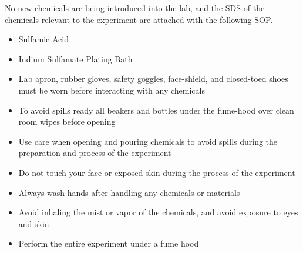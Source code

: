 \begin{center} %
    \begin{framed} %
        \begin{minipage}{0.8\textwidth} %
            \raggedright %
            \setcounter{mpsection}{2}


            No new chemicals are being introduced into the lab, and the SDS of the chemicals relevant to the experiment are attached with the following SOP.

            \begin{itemize}
                \item Sulfamic Acid
                \item Indium Sulfamate Plating Bath
            \end{itemize}

            \begin{itemize}
                \item Lab apron, rubber gloves, safety goggles, face-shield, and closed-toed shoes must be worn before interacting with any chemicals
                \item To avoid spills ready all beakers and bottles under the fume-hood over clean room wipes before opening
                \item Use care when opening and pouring chemicals to avoid spills during the preparation and process of the experiment
                \item Do not touch your face or exposed skin during the process of the experiment
                \item Always wash hands after handling any chemicals or materials
                \item Avoid inhaling the mist or vapor of the chemicals, and avoid exposure to eyes and skin
                \item Perform the entire experiment under a fume hood
            \end{itemize}
        \end{minipage}
    \end{framed}
\end{center}


